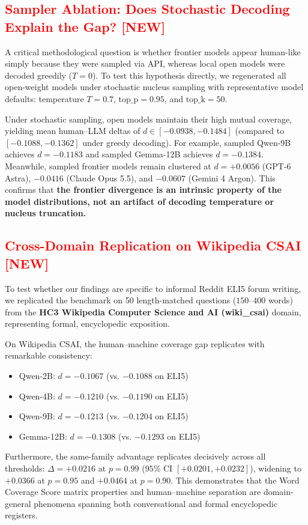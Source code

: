 \documentclass[11pt,a4paper,twocolumn]{article}
\newcommand{\diff}[1]{\textcolor{red}{#1}}
\newenvironment{diffblock}{\color{red}}{}
\begin{document}
\subsection{\diff{Sampler Ablation: Does Stochastic Decoding Explain the Gap? [NEW]}}
\begin{diffblock}
A critical methodological question is whether frontier models appear human-like simply because they were sampled via API, whereas local open models were decoded greedily ($T=0$). To test this hypothesis directly, we regenerated all open-weight models under stochastic nucleus sampling with representative model defaults: temperature $T=0.7$, $\text{top\_p}=0.95$, and $\text{top\_k}=50$.

Under stochastic sampling, open models maintain their high mutual coverage, yielding mean human--LLM deltas of $d \in [-0.0938, -0.1484]$ (compared to $[-0.1088, -0.1362]$ under greedy decoding). For example, sampled Qwen-9B achieves $d = -0.1183$ and sampled Gemma-12B achieves $d = -0.1384$. Meanwhile, sampled frontier models remain clustered at $d = +0.0056$ (GPT-6 Astra), $-0.0416$ (Claude Opus 5.5), and $-0.0607$ (Gemini 4 Argon). This confirms that \textbf{the frontier divergence is an intrinsic property of the model distributions, not an artifact of decoding temperature or nucleus truncation.}
\end{diffblock}

\subsection{\diff{Cross-Domain Replication on Wikipedia CSAI [NEW]}}
\begin{diffblock}
To test whether our findings are specific to informal Reddit ELI5 forum writing, we replicated the benchmark on 50 length-matched questions ($150$--$400$ words) from the \textbf{HC3 Wikipedia Computer Science and AI (wiki\_csai)} domain, representing formal, encyclopedic exposition.

On Wikipedia CSAI, the human--machine coverage gap replicates with remarkable consistency:
\begin{itemize}
    \item Qwen-2B: $d = -0.1067$ (vs. $-0.1088$ on ELI5)
    \item Qwen-4B: $d = -0.1210$ (vs. $-0.1190$ on ELI5)
    \item Qwen-9B: $d = -0.1213$ (vs. $-0.1204$ on ELI5)
    \item Gemma-12B: $d = -0.1308$ (vs. $-0.1293$ on ELI5)
\end{itemize}
Furthermore, the same-family advantage replicates decisively across all thresholds: $\Delta = +0.0216$ at $p=0.99$ ($95\%$ CI $[+0.0201, +0.0232]$), widening to $+0.0366$ at $p=0.95$ and $+0.0464$ at $p=0.90$. This demonstrates that the Word Coverage Score matrix properties and human--machine separation are domain-general phenomena spanning both conversational and formal encyclopedic registers.
\end{diffblock}
\end{document}
